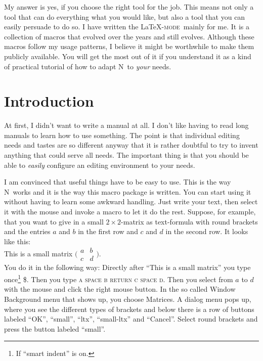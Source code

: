 \documentclass{article}
\newcommand{\latexpack}{\LaTeX-\textsc{mode}}
\newcommand{\nedit}{N\kern-0.8pt{Edit}}
\newcommand{\keyname}[1]{\textsc{#1}}
\begin{document}
My answer is yes, if you choose the right tool for the job. This means not only a tool that can do everything what you would like, but also a tool that you can easily persuade to do so. I have written the \latexpack\ mainly for me. It is a collection of macros that evolved over the years and still evolves. Although these macros follow my usage patterns, I believe it might be worthwhile to make them publicly available.  You will get the most out of it if  you understand it as a kind of practical tutorial of how to adapt \nedit\ to \emph{your} needs.

\section{Introduction}
At first, I didn't want to write a manual at all. I don't like having to read long manuals to learn how to use something.
The point is that individual editing needs and tastes are so different anyway that it is rather doubtful to try to invent anything that could serve all needs. The important thing is that you should be able to \emph{easily} configure an editing environment to your needs.

I am convinced that useful things have to be easy to use. This is the way \nedit\ works and it is the way this macro package is written. You can start using it without having to learn some awkward handling. Just write your text, then select it with the mouse and invoke a macro to let it do the rest. Suppose, for example, that you want to give in a small $2\times 2$-matrix as text-formula with round brackets and the entries $a$ and $b$ in the first row and $c$ and $d$ in the second row. It looks like this:\\

This is a small matrix 
$\bigl(
\begin{smallmatrix}
a & b\\
c & d
\end{smallmatrix}
\bigr)$.\\


You do it in the following way:
Directly after ``This is a small matrix'' you type once\footnote{If ``smart indent'' is on.} \$. Then you type 
\keyname{a space b return c space d}.
Then you select from $a$ to $d$ with the mouse and click the right mouse button. In the so called Window Background menu that shows up, you choose Matrices. A dialog menu pops up, where you see the different types of brackets and below there is a row of buttons labeled ``OK'', ``small'', ``ltx'', ``small-ltx'' and ``Cancel''. Select round brackets and press the button labeled ``small''.
\end{document}
